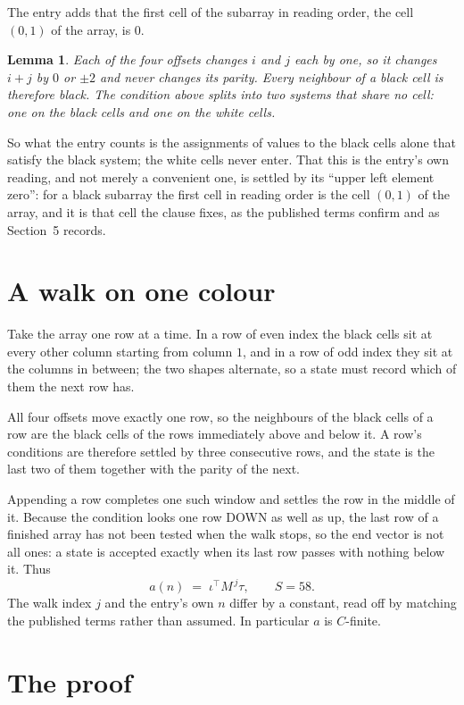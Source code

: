 \documentclass[11pt,a4paper]{article}
\theoremstyle{plain}
\newtheorem{lemma}[theorem]{Lemma}
\theoremstyle{definition}
\begin{document}
The entry adds that the first cell of the subarray in reading order, the cell $(0,1)$ of the array, is $0$.

\begin{lemma}\label{lem:split}
Each of the four offsets changes $i$ and $j$ each by one, so it changes $i+j$ by $0$ or $\pm2$
and never changes its parity. Every neighbour of a black cell is therefore black. The condition
above splits into two systems that share no cell: one on the black cells and one on the white
cells.
\end{lemma}

So what the entry counts is the assignments of values to the black cells alone that satisfy the
black system; the white cells never enter. That this is the entry's own reading, and not
merely a convenient one, is settled by its ``upper left element zero'': for a black subarray the
first cell in reading order is the cell $(0,1)$ of the array, and it is that cell the
clause fixes, as the published terms confirm and as Section~5 records.

\section{A walk on one colour}

Take the array one row at a time. In a row of even index the black cells sit at every other
column starting from column $1$, and in a row of odd index they sit at the columns in
between; the two shapes alternate, so a state must record which of them the next row has.

All four offsets move exactly one row, so the neighbours of the black cells of a row are the
black cells of the rows immediately above and below it. A row's conditions are therefore settled
by three consecutive rows, and the state is the last two of them together with the parity of the
next.

Appending a row completes one such window and settles the row in the middle of it. Because the
condition looks one row DOWN as well as up, the last row of a finished array has not been tested
when the walk stops, so the end vector is not all ones: a state is accepted exactly when its
last row passes with nothing below it. Thus
\[
a(n)\;=\;\iota^{\!\top}M^{\,j}\tau ,\qquad S=58.
\]
The walk index $j$ and the entry's own $n$ differ by a constant, read off by matching the
published terms rather than assumed. In particular $a$ is $C$-finite.

\section{The proof}
\end{document}
